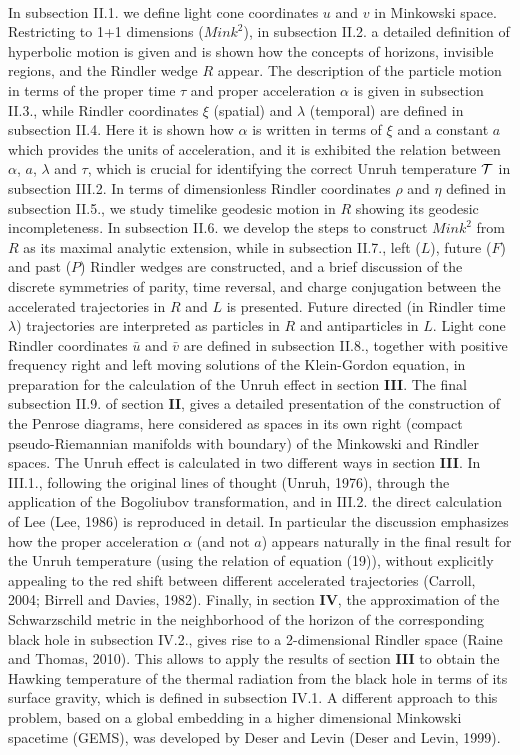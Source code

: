 \

In subsection II.1. we define light cone coordinates $u$ and $v$ in Minkowski space. Restricting to 1+1 dimensions ($Mink^2$), in subsection II.2. a detailed definition of hyperbolic motion is given and is shown how the concepts of horizons, invisible regions, and the Rindler wedge $R$ appear. The description of the particle motion in terms of the proper time $\tau$ and proper acceleration $\alpha$ is given in subsection II.3., while Rindler coordinates $\xi$ (spatial) and $\lambda$ (temporal) are defined in subsection II.4. Here it is shown how $\alpha$ is written in terms of $\xi$ and a constant $a$ which provides the units of acceleration, and it is exhibited the relation between $\alpha$, $a$, $\lambda$ and $\tau$, which is crucial for identifying the correct Unruh temperature ${\cal T}$ in subsection III.2. In terms of dimensionless Rindler coordinates $\rho$ and $\eta$ defined in subsection II.5., we study timelike geodesic motion in $R$ showing its geodesic incompleteness. In subsection II.6. we develop the steps to construct $Mink^2$ from $R$ as its maximal analytic extension, while in subsection II.7., left ($L$), future ($F$) and past ($P$) Rindler wedges are constructed, and a brief discussion of the discrete symmetries of parity, time reversal, and charge conjugation between the accelerated trajectories in $R$ and $L$ is presented. Future directed (in Rindler time $\lambda$) trajectories are interpreted as particles in $R$ and antiparticles in $L$. Light cone Rindler coordinates $\bar{u}$ and $\bar{v}$ are defined in subsection II.8., together with positive frequency right and left moving solutions of the Klein-Gordon equation, in preparation for the calculation of the Unruh effect in section {\bf III}. The final subsection II.9. of section {\bf II}, gives a detailed presentation of the construction of the Penrose diagrams, here considered as spaces in its own right (compact pseudo-Riemannian manifolds with boundary) of the Minkowski and Rindler spaces. The Unruh effect is calculated in two different ways in section {\bf III}. In III.1., following the original lines of thought (Unruh, 1976), through the application of the Bogoliubov transformation, and in III.2. the direct calculation of Lee (Lee, 1986) is reproduced in detail. In particular the discussion emphasizes how the proper acceleration $\alpha$ (and not $a$) appears naturally in the final result for the Unruh temperature (using the relation of equation (19)), without explicitly appealing to the red shift between different accelerated trajectories (Carroll, 2004; Birrell and Davies, 1982). Finally, in section {\bf IV}, the approximation of the Schwarzschild metric in the neighborhood of the horizon of the corresponding black hole in subsection IV.2., gives rise to a 2-dimensional Rindler space (Raine and Thomas, 2010). This allows to apply the results of section {\bf III} to obtain the Hawking temperature of the thermal radiation from the black hole in terms of its surface gravity, which is defined in subsection IV.1. A different approach to this problem, based on a global embedding in a higher dimensional Minkowski spacetime (GEMS), was developed by Deser and Levin (Deser and Levin, 1999). 

